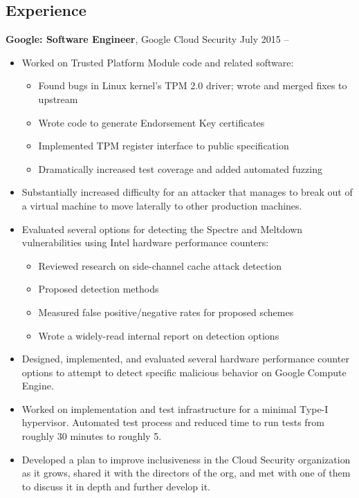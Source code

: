 \documentclass[margin]{res} \usepackage{hyperref}
\begin{document}
\begin{resume}
\section{Experience}
  \textbf{Google: Software Engineer}, Google Cloud Security \hfill July 2015 --
  \begin{minipage}{0.84\textwidth}
    \vspace{0.2em}
    \begin{itemize} \itemsep -1pt
        \item Worked on Trusted Platform Module code and related software:
          \vspace{-0.5em}
          \begin{itemize} \itemsep -1pt
            \item Found bugs in Linux kernel's TPM 2.0 driver; wrote and
              merged fixes to upstream
            \item Wrote code to generate Endorsement Key certificates
            \item Implemented TPM register interface to public specification
            \item Dramatically increased test coverage and added automated fuzzing
          \end{itemize}
        \item Substantially increased difficulty for an attacker that manages
          to break out of a virtual machine to move laterally to other
          production machines.
        \item Evaluated several options for detecting the Spectre and Meltdown
          vulnerabilities using Intel hardware performance counters:
          \vspace{-0.5em}
          \begin{itemize} \itemsep -1pt
            \item Reviewed research on side-channel cache attack detection
            \item Proposed detection methods
            \item Measured false positive/negative rates for proposed schemes
            \item Wrote a widely-read internal report on detection options
          \end{itemize}
        \item Designed, implemented, and evaluated several hardware
          performance counter options to attempt to detect specific
          malicious behavior on Google Compute Engine.
        \item Worked on implementation and test infrastructure for a
          minimal Type-I hypervisor. Automated test process and reduced time
          to run tests from roughly 30 minutes to roughly 5.
        \item Developed a plan to improve inclusiveness in the Cloud Security
          organization as it grows, shared it with the directors of the org,
          and met with one of them to discuss it in depth and further develop
          it.
    \end{itemize}
  \end{minipage}


\end{resume}
\end{document}
